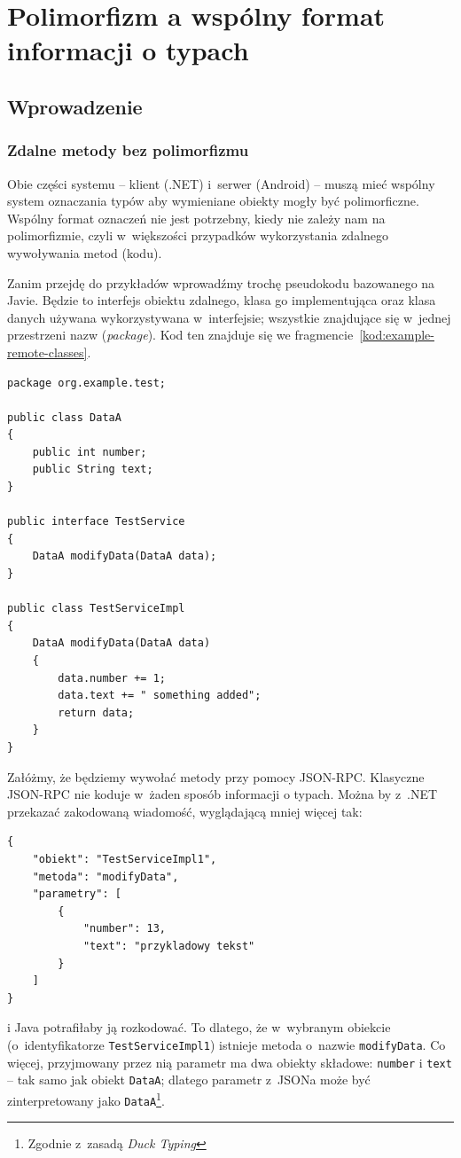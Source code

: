 \section{Polimorfizm a wspólny format informacji o typach}

\subsection{Wprowadzenie}

\subsubsection{Zdalne metody bez polimorfizmu}
Obie części systemu -- klient (.NET) i~serwer (Android) -- muszą mieć wspólny system oznaczania typów aby wymieniane obiekty mogły być polimorficzne. 
Wspólny format oznaczeń nie jest potrzebny, kiedy nie zależy nam na polimorfizmie, czyli w~większości przypadków wykorzystania zdalnego wywoływania metod (kodu).

Zanim przejdę do przykładów wprowadźmy trochę pseudokodu bazowanego na Javie. Będzie to interfejs obiektu zdalnego, klasa go implementująca oraz klasa danych używana wykorzystywana w~interfejsie; wszystkie znajdujące się w~jednej przestrzeni nazw (\emph{package}). Kod ten znajduje się we fragmencie~\ref{kod:example-remote-classes}.

\begin{lstlisting}[float, frame=single, caption={Przykładowy kod metody zdalnej.}, label=kod:example-remote-classes]
package org.example.test;

public class DataA
{
    public int number;
    public String text;
}

public interface TestService
{        
    DataA modifyData(DataA data);
}

public class TestServiceImpl
{
    DataA modifyData(DataA data)
    {
        data.number += 1;
        data.text += " something added";
        return data;
    }
}
\end{lstlisting}

Załóżmy, że będziemy wywołać metody przy pomocy JSON-RPC. Klasyczne JSON-RPC nie koduje w~żaden sposób informacji o typach. Można by z~.NET przekazać zakodowaną wiadomość, wyglądającą mniej więcej tak:
\begin{lstlisting}[frame=single]
{
    "obiekt": "TestServiceImpl1",
    "metoda": "modifyData",
    "parametry": [
        {
            "number": 13,
            "text": "przykladowy tekst"
        }
    ]
}
\end{lstlisting}
i Java potrafiłaby ją rozkodować. To dlatego, że w~wybranym obiekcie (o~identyfikatorze \texttt{TestServiceImpl1}) istnieje metoda o~nazwie \texttt{modifyData}. Co więcej, przyjmowany przez nią parametr ma dwa obiekty składowe: \texttt{number} i \texttt{text} -- tak samo jak obiekt \texttt{DataA}; dlatego parametr z~JSONa może być zinterpretowany jako \texttt{DataA}\footnote{Zgodnie z~zasadą \emph{Duck Typing}}.

